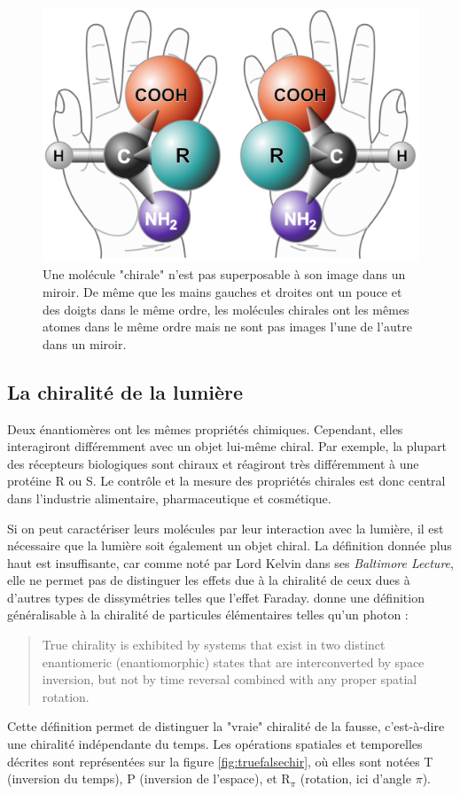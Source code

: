\begin{figure}[!ht]
\centering
\includegraphics[width=.5\columnwidth]{Figures/Chirality/chirality_with_hands.pdf}%
\caption{Une molécule "chirale" n'est pas superposable à son image dans un miroir. De même que les mains gauches et droites ont un pouce et des doigts dans le même ordre, les molécules chirales ont les mêmes atomes dans le même ordre mais ne sont pas images l'une de l'autre dans un miroir.}
\label{fig:chirality}
\end{figure}

\subsection{La chiralité de la lumière}
Deux énantiomères ont les mêmes propriétés chimiques. Cependant, elles interagiront différemment avec un objet lui-même chiral. Par exemple, la plupart des récepteurs biologiques sont chiraux et réagiront très différemment à une protéine R ou S. Le contrôle et la mesure des propriétés chirales est donc central dans l'industrie alimentaire, pharmaceutique et cosmétique. 

Si on peut caractériser leurs molécules par leur interaction avec la lumière, il est nécessaire que la lumière soit également un objet chiral. La définition donnée plus haut est insuffisante, car comme noté par Lord Kelvin dans ses \textit{Baltimore Lecture}, elle ne permet pas de distinguer les effets due à la chiralité de ceux dues à d'autres types de dissymétries telles que l'effet Faraday.  donne une définition généralisable à la chiralité de particules élémentaires telles qu'un photon :

\begin{quotation}
True chirality is exhibited by systems that exist in two distinct enantiomeric (enantiomorphic) states that are interconverted by space inversion, but not by time reversal combined with any proper spatial rotation.
\end{quotation}

Cette définition permet de distinguer la "vraie" chiralité de la fausse, c'est-à-dire une chiralité indépendante du temps. Les opérations spatiales et temporelles décrites sont représentées sur la figure \ref{fig:truefalsechir}, où elles sont notées T (inversion du temps), P (inversion de l'espace), et $\text{R}_{\pi}$ (rotation, ici d'angle $\pi$). 

